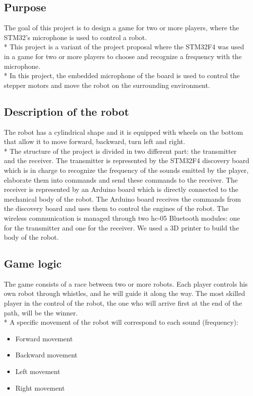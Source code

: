 \subsection{Purpose}
The goal of this project is to design a game for two or more players, where the STM32’s microphone is used to control a robot.\\*
This project is a variant of the project proposal where the STM32F4 was used in a game for two or more players to choose and recognize a frequency with the microphone.\\*
In this project, the embedded microphone of the board is used to control the stepper motors and move the robot on the surrounding environment.

\subsection{Description of the robot}
The robot has a cylindrical shape and it is equipped with wheels on the bottom that allow it to move forward, backward, turn left and right.\\*
The structure of the project is divided in two different part: the transmitter and the receiver.
The transmitter is represented by the STM32F4 discovery board which is in charge to recognize the frequency of the sounds emitted by the player, elaborate them into commands and send these commands to the receiver.
The receiver is represented by an Arduino board which is directly connected to the mechanical body of the robot. The Arduino board receives the commands from the discovery board and uses them to control the engines of the robot.
The wireless communication is managed through two hc-05 Bluetooth modules: one for the transmitter and one for the receiver.
We used a 3D printer to build the body of the robot. 

\subsection{Game logic}
The game consists of a race between two or more robots. Each player controls his own robot through whistles, and he will guide it along the way. The most skilled player in the control of the robot, the one who will arrive first at the end of the path, will be the winner.\\*
A specific movement of the robot will correspond to each sound (frequency):
\begin{itemize}
	\item Forward movement
	\item Backward movement
	\item Left movement
	\item Right movement
\end{itemize}

